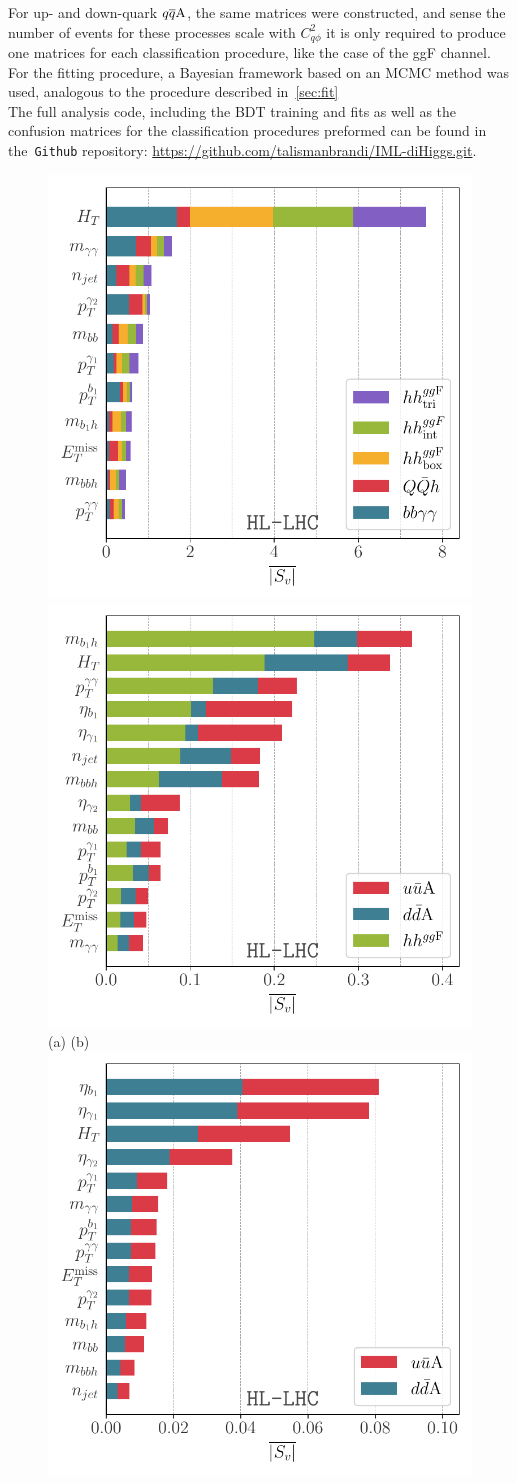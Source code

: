 For up- and down-quark $ q\overline q \rm A$, the same matrices were constructed, and sense the number of events for these processes scale with $C_{q\phi}^2$ it is only required to produce one matrices for each classification procedure, like the case of the ggF channel. For the fitting procedure, a Bayesian framework based on an MCMC method was used, analogous to the procedure described in~\autoref{sec:fit} \\  The full analysis code, including the BDT training and fits as well as the confusion matrices for the classification procedures preformed can be found in the~\texttt{Github} repository: \href{https://github.com/talismanbrandi/IML-diHiggs.git}{https://github.com/talismanbrandi/IML-diHiggs.git}. 
\begin{figure}[t!]
	\centering
	\includegraphics[width=0.45\linewidth]{fig/HL-LHC-shap-bbxaa-bbh-tth-hhsm.pdf}
		\includegraphics[width=0.45\linewidth]{fig/HL-LHC-shap-ku-kd-hhsm.pdf}
				  \hspace{.8 cm} 			  { \footnotesize  (a)}    \hspace{6. cm}        { \footnotesize  (b)}  \\
	\includegraphics[width=0.45\linewidth]{fig/HL-LHC-shap-ku-kd.pdf}\\

\end{figure}
